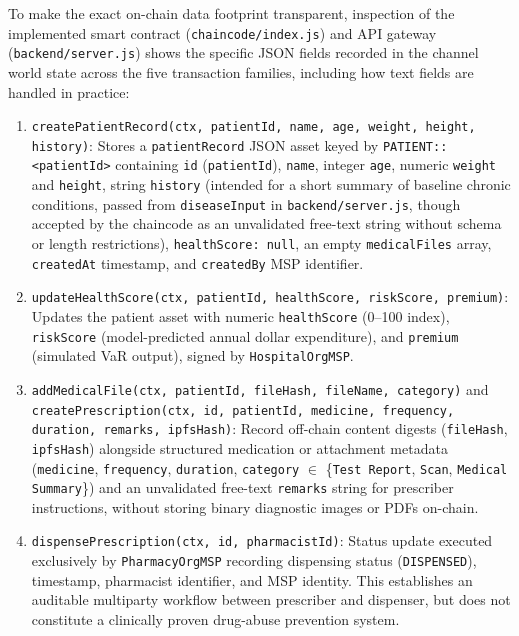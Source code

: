 \documentclass[runningheads]{llncs}
\begin{document}
To make the exact on-chain data footprint transparent, inspection of the implemented smart contract (\texttt{chaincode/index.js}) and API gateway (\texttt{backend/server.js}) shows the specific JSON fields recorded in the channel world state across the five transaction families, including how text fields are handled in practice:
\begin{enumerate}
    \item \texttt{createPatientRecord(ctx, patientId, name, age, weight, height, history)}: Stores a \texttt{patientRecord} JSON asset keyed by \texttt{PATIENT::<patientId>} containing \texttt{id} (\texttt{patientId}), \texttt{name}, integer \texttt{age}, numeric \texttt{weight} and \texttt{height}, string \texttt{history} (intended for a short summary of baseline chronic conditions, passed from \texttt{diseaseInput} in \texttt{backend/server.js}, though accepted by the chaincode as an unvalidated free-text string without schema or length restrictions), \texttt{healthScore: null}, an empty \texttt{medicalFiles} array, \texttt{createdAt} timestamp, and \texttt{createdBy} MSP identifier.
    \item \texttt{updateHealthScore(ctx, patientId, healthScore, riskScore, premium)}: Updates the patient asset with numeric \texttt{healthScore} (0--100 index), \texttt{riskScore} (model-predicted annual dollar expenditure), and \texttt{premium} (simulated VaR output), signed by \texttt{HospitalOrgMSP}.
    \item \texttt{addMedicalFile(ctx, patientId, fileHash, fileName, category)} and \texttt{createPrescription(ctx, id, patientId, medicine, frequency, duration, remarks, ipfsHash)}: Record off-chain content digests (\texttt{fileHash}, \texttt{ipfsHash}) alongside structured medication or attachment metadata (\texttt{medicine}, \texttt{frequency}, \texttt{duration}, \texttt{category} $\in$ \{\texttt{Test Report}, \texttt{Scan}, \texttt{Medical Summary}\}) and an unvalidated free-text \texttt{remarks} string for prescriber instructions, without storing binary diagnostic images or PDFs on-chain.
    \item \texttt{dispensePrescription(ctx, id, pharmacistId)}: Status update executed exclusively by \texttt{PharmacyOrgMSP} recording dispensing status (\texttt{DISPENSED}), timestamp, pharmacist identifier, and MSP identity. This establishes an auditable multiparty workflow between prescriber and dispenser, but does not constitute a clinically proven drug-abuse prevention system.

\end{enumerate}
\end{document}
